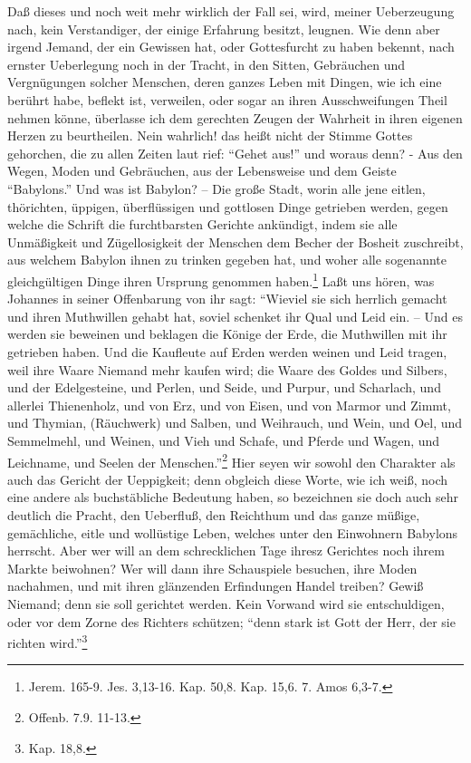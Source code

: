 Daß dieses und noch weit mehr wirklich der Fall sei, wird, meiner Ueberzeugung nach, kein Verstandiger, der einige Erfahrung besitzt, leugnen. Wie denn aber irgend Jemand, der ein Gewissen hat, oder Gottesfurcht zu haben bekennt, nach ernster Ueberlegung noch in der Tracht, in den Sitten, Gebräuchen und Vergnügungen solcher Menschen, deren ganzes Leben mit Dingen, wie ich eine berührt habe, beflekt ist, verweilen, oder sogar an ihren Ausschweifungen Theil nehmen könne, überlasse ich dem gerechten Zeugen der Wahrheit in ihren eigenen Herzen zu beurtheilen. Nein wahrlich! das heißt nicht der Stimme Gottes gehorchen,  die zu allen Zeiten laut rief: "`Gehet aus!"' und woraus denn? - Aus den Wegen, Moden und Gebräuchen, aus der Lebensweise und dem Geiste "`Babylons."' Und was ist Babylon? -- Die große Stadt, worin alle jene eitlen, thörichten, üppigen, überflüssigen und gottlosen Dinge getrieben werden, gegen welche die Schrift die furchtbarsten Gerichte ankündigt, indem sie alle Unmäßigkeit und Zügellosigkeit der Menschen dem Becher der Bosheit zuschreibt, aus welchem Babylon ihnen zu trinken gegeben hat, und woher alle sogenannte gleichgültigen Dinge ihren Ursprung genommen haben.\footnote{Jerem. 165-9. Jes. 3,13-16. Kap. 50,8. Kap. 15,6. 7. Amos 6,3-7.} Laßt uns hören, was Johannes in seiner Offenbarung von ihr sagt: "`Wieviel sie sich herrlich gemacht und ihren Muthwillen gehabt hat, soviel schenket ihr Qual und Leid ein. -- Und es werden sie beweinen und beklagen die Könige der Erde, die Muthwillen mit ihr getrieben haben. Und die Kaufleute auf Erden werden weinen und Leid tragen, weil ihre Waare Niemand mehr kaufen wird; die Waare des Goldes und Silbers, und der Edelgesteine, und Perlen, und Seide, und Purpur, und Scharlach, und allerlei Thienenholz, und von Erz, und von Eisen, und von Marmor und Zimmt, und Thymian, (Räuchwerk) und Salben, und Weihrauch, und Wein, und Oel, und Semmelmehl, und Weinen, und Vieh und Schafe, und Pferde und Wagen, und Leichname, und Seelen der Menschen."'\footnote{Offenb. 7.9. 11-13.} Hier seyen wir sowohl den Charakter als auch das Gericht der Ueppigkeit; denn obgleich diese Worte, wie ich weiß, noch eine andere als buchstäbliche Bedeutung haben, so bezeichnen sie doch auch sehr deutlich die Pracht, den Ueberfluß, den Reichthum und das ganze müßige, gemächliche, eitle und wollüstige Leben, welches unter den Einwohnern Babylons herrscht. Aber wer will an dem schrecklichen Tage ihresz Gerichtes noch ihrem Markte beiwohnen? Wer will dann ihre Schauspiele besuchen, ihre Moden nachahmen, und mit ihren glänzenden Erfindungen Handel treiben? Gewiß Niemand; denn sie soll gerichtet werden. Kein Vorwand wird sie entschuldigen, oder vor dem Zorne des Richters schützen; "`denn stark ist Gott der Herr, der sie richten wird."'\footnote{Kap. 18,8.}

